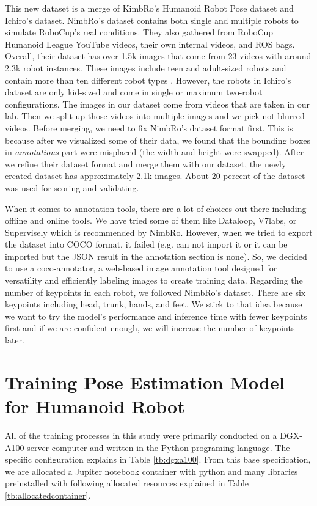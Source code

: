 This new dataset is a merge of KimbRo's Humanoid Robot Pose dataset and Ichiro's dataset. NimbRo's dataset contains both single and multiple robots to
simulate RoboCup's real conditions. They also gathered from RoboCup Humanoid League YouTube videos, their own internal videos, and ROS bags. 
Overall, their dataset has over 1.5k images that come from 23 videos with around 2.3k robot instances. These images include teen and adult-sized robots and contain more than ten different robot types \parencite{amini2021}.
However, the robots in Ichiro's dataset are only kid-sized and come in single or maximum two-robot configurations. The images in our dataset come from videos that are taken in our lab. 
Then we split up those videos into multiple images and we pick not blurred videos.
Before merging, we need to fix NimbRo's dataset format first. This is because after we visualized some of their data, we found that the bounding boxes in \emph{annotations} part were misplaced (the width and height were swapped).
After we refine their dataset format and merge them with our dataset, the newly created dataset has approximately 2.1k images.
About 20 percent of the dataset was used for scoring and validating.

When it comes to annotation tools, there are a lot of choices out there including offline and online tools. We have tried some of them like Dataloop, V7labs, or Supervisely which is recommended by NimbRo.
However, when we tried to export the dataset into COCO format, it failed (e.g. can not import it or it can be imported but the JSON result in the annotation section is none). So, we decided to use a coco-annotator,
a web-based image annotation tool designed for versatility and efficiently labeling images to create training data. Regarding the number of keypoints in each robot, we followed NimbRo's dataset.
There are six keypoints including head, trunk, hands, and feet. We stick to that idea because we want to try the model's performance and inference time with fewer keypoints first and if we are confident enough, we will increase the number of keypoints later.


\section{Training Pose Estimation Model for Humanoid Robot}
\label{sec:trainingrobot}

All of the training processes in this study were primarily conducted on a DGX-A100 server computer and written in the Python programing language. The specific configuration explains in Table \ref{tb:dgxa100}.
From this base specification, we are allocated a Jupiter notebook container with
python and many libraries preinstalled with following allocated resources explained in Table \ref{tb:allocatedcontainer}.

